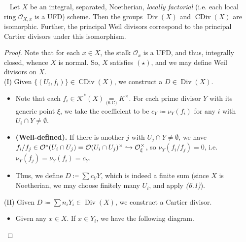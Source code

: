 \documentclass[11pt,a4paper,footinclude=true,headinclude=true]{scrbook} %
\DeclareMathOperator{\Spec}{Spec}
\DeclareMathOperator{\CDiv}{CDiv}
\DeclareMathOperator{\Div}{Div}
\newcommand{\KK}{\mathscr{K}}
\newcommand{\OO}{\mathcal{O}}
\newcommand{\pp}{\mathfrak{p}}
\newcommand{\qq}{\mathfrak{q}}
\newcommand{\<}{\langle}
\newcommand{\>}{\rangle}
\newcommand\FibSq[2][\square]{%
  \arrow[mysymbol]{#2}[description]{#1}}
\newenvironment{proposition}[2][]
{\renewcommand\theinnercustomprop{#2}\innercustomprop[#1] 
\begin{mdframed}[backgroundcolor=gray!20]\ }
{\end{mdframed}\endinnercustomprop}
\begin{document}
\begin{proposition}{6.11}
    Let $X$ be an integral, separated, Noetherian, \textit{locally factorial} (i.e. each local ring $\OO_{X,x}$ is a UFD) scheme. Then the groups $\Div(X)$ and $\CDiv(X)$ are isomorphic. Further, the principal Weil divisors correspond to the principal Cartier divisors under this isomorphism.
\end{proposition}
\begin{proof}
    Note that for each $x\in X$, the stalk $\OO_x$ is a UFD, and thus, integrally closed, whence $X$ is normal. So, $X$ satisfies $(\star)$, and we may define Weil divisors on $X$. \\
    
    (I) Given $\{(U_i,f_i)\}\in\CDiv(X)$, we construct a $D\in\Div(X)$.
    \begin{itemize}
        \item Note that each $f_i\in\KK^\ast(X)\underset{\text{(6.C)}}{=}K^\times$. For each prime divisor $Y$ with its generic point $\xi$, we take the coefficient to be $c_Y\coloneqq\nu_Y(f_i)$ for any $i$ with $U_i\cap Y\neq\emptyset$. 
        \item \textbf{(Well-defined).} If there is another $j$ with $U_j\cap Y\neq\emptyset$, we have $f_i/f_j\in\OO^\ast(U_i\cap U_j)=\OO(U_i\cap U_j)^\times\xhookrightarrow{}\OO_\xi^\times$, so $\nu_Y(f_i/f_j)=0$, i.e. $\nu_Y(f_j)=\nu_Y(f_i)=c_Y$.
        \item Thus, we define $D\coloneqq\sum c_YY$, which is indeed a finite sum (since $X$ is Noetherian, we may choose finitely many $U_i$, and apply \textit{(6.1)}).
    \end{itemize}
    (II) Given $D\coloneqq\sum n_iY_i\in\Div(X)$, we construct a Cartier divisor.
    \begin{itemize}
        \item Given any $x\in X$. If $x\in Y_i$, we have the following diagram.
        \begin{center}
        \end{center}

\end{itemize}
\end{proof}
\end{document}
